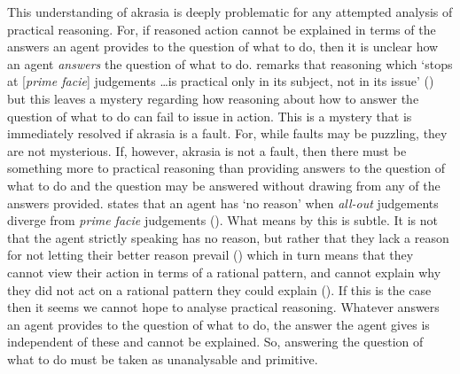 \documentclass[10pt]{article}
\begin{document}
This understanding of akrasia is deeply problematic for any attempted analysis of practical reasoning.
For, if reasoned action cannot be explained in terms of the answers an agent provides to the question of what to do, then it is unclear how an agent \emph{answers} the question of what to do.
\citeauthor{Davidson:1969aa} remarks that reasoning which `stops at [\emph{prime facie}] judgements \dots is practical only in its subject, not in its issue' (\citeyear[39]{Davidson:1969aa}) but this leaves a mystery regarding how reasoning about how to answer the question of what to do can fail to issue in action.
This is a mystery that is immediately resolved if akrasia is a fault.
For, while faults may be puzzling, they are not mysterious.
If, however, akrasia is not a fault, then there must be something more to practical reasoning than providing answers to the question of what to do and the question may be answered without drawing from any of the answers provided.
\citeauthor{Davidson:1969aa} states that an agent has `no reason' when \emph{all-out} judgements diverge from \emph{prime facie} judgements (\citeyear[42]{Davidson:1969aa}).
What \citeauthor{Davidson:1969aa} means by this is subtle.
It is not that the agent strictly speaking has no reason, but rather that they lack a reason for not letting their better reason prevail (\citeyear[42fn.25]{Davidson:1969aa}) which in turn means that they cannot view their action in terms of a rational pattern, and cannot explain why they did not act on a rational pattern they could explain (\citeyear[42]{Davidson:1969aa}).
If this is the case then it seems we cannot hope to analyse practical reasoning.
Whatever answers an agent provides to the question of what to do, the answer the agent gives is independent of these and cannot be explained.
So, answering the question of what to do must be taken as unanalysable and primitive.
\end{document}
